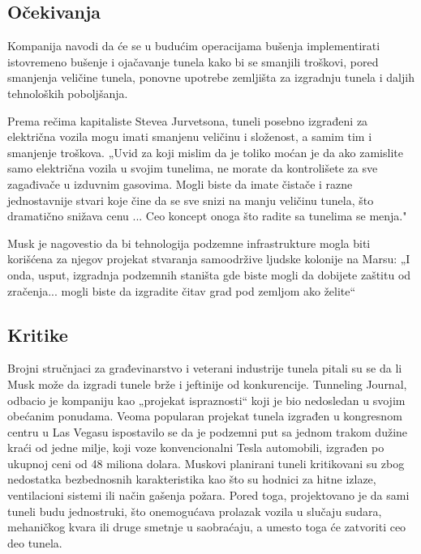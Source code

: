 \documentclass[a4paper,11pt]{article}
\begin{document}
\subsection{Očekivanja}

Kompanija navodi da će se u budućim operacijama bušenja implementirati istovremeno bušenje i ojačavanje tunela kako bi se smanjili troškovi, pored smanjenja veličine tunela, ponovne upotrebe zemljišta za izgradnju tunela i daljih tehnoloških poboljšanja.

Prema rečima kapitaliste Stevea Jurvetsona, tuneli posebno izgrađeni za električna vozila mogu imati smanjenu veličinu i složenost, a samim tim i smanjenje troškova. „Uvid za koji mislim da je toliko moćan je da ako zamislite samo električna vozila u svojim tunelima, ne morate da kontrolišete za sve zagađivače u izduvnim gasovima. Mogli biste da imate čistače i razne jednostavnije stvari koje čine da se sve snizi na manju veličinu tunela, što dramatično snižava cenu ... Ceo koncept onoga što radite sa tunelima se menja."

Musk je nagovestio da bi tehnologija podzemne infrastrukture mogla biti korišćena za njegov projekat stvaranja samoodržive ljudske kolonije na Marsu: „I onda, usput, izgradnja podzemnih staništa gde biste mogli da dobijete zaštitu od zračenja... mogli biste da izgradite čitav grad pod zemljom ako želite“




\subsection{Kritike}

Brojni stručnjaci za građevinarstvo i veterani industrije tunela pitali su se da li Musk može da izgradi tunele brže i jeftinije od konkurencije. Tunneling Journal, odbacio je kompaniju kao „projekat ispraznosti“ koji je bio nedosledan u svojim obećanim ponudama. Veoma popularan projekat tunela izgrađen u kongresnom centru u Las Vegasu ispostavilo se da je podzemni put sa jednom trakom dužine kraći od jedne milje, koji voze konvencionalni Tesla automobili, izgrađen po ukupnoj ceni od 48 miliona dolara. Muskovi planirani tuneli kritikovani su zbog nedostatka bezbednosnih karakteristika kao što su hodnici za hitne izlaze, ventilacioni sistemi ili način gašenja požara. Pored toga, projektovano je da sami tuneli budu jednostruki, što onemogućava prolazak vozila u slučaju sudara, mehaničkog kvara ili druge smetnje u saobraćaju, a umesto toga će zatvoriti ceo deo tunela.
\end{document}
